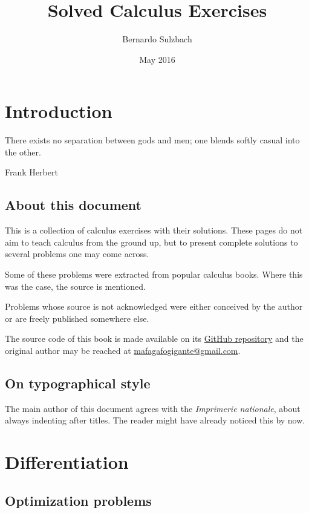 \documentclass[a4paper, titlepage]{article}
\title{Solved Calculus Exercises}
\author{Bernardo Sulzbach}
\date{May 2016}
\begin{document}
\maketitle

\tableofcontents

\section{Introduction}

\setlength{\epigraphwidth}{3in}
\epigraph{There exists no separation between gods and men; one blends softly
casual into the other.}{Frank Herbert}

\subsection{About this document}

This is a collection of calculus exercises with their solutions. These pages do
not aim to teach calculus from the ground up, but to present complete solutions
to several problems one may come across.

Some of these problems were extracted from popular calculus books.
Where this was the case, the source is mentioned.

Problems whose source is not acknowledged were either conceived by
the author or are freely published somewhere else.

The source code of this book is made available on its
\href{https://github.com/mafagafogigante/solved-calculus-exercises}{GitHub
repository} and the original author may be reached at
\href{mailto:mafagafogigante@gmail.com}{mafagafogigante@gmail.com}.

\subsection{On typographical style}

The main author of this document agrees with the \textit{Imprimerie nationale},
about always indenting after titles. The reader might have already noticed this
by now.

\section{Differentiation}

\subsection{Optimization problems}
\end{document}
